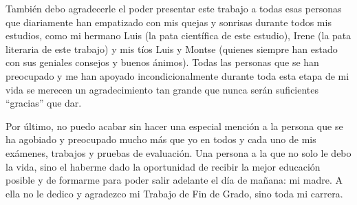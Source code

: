 También debo agradecerle el poder presentar este trabajo a todas esas personas que diariamente han empatizado con mis quejas y sonrisas durante todos mis estudios, como mi hermano Luis (la pata científica de este estudio), Irene (la pata literaria de este trabajo) y mis tíos Luis y Montse (quienes siempre han estado con sus geniales consejos y buenos ánimos). Todas las personas que se han preocupado y me han apoyado incondicionalmente durante toda esta etapa de mi vida se merecen un agradecimiento tan grande que nunca serán suficientes ``gracias'' que dar.

Por último, no puedo acabar sin hacer una especial mención a la persona que se ha agobiado y preocupado mucho más que yo en todos y cada uno de mis exámenes, trabajos y pruebas de evaluación. Una persona a la que no solo le debo la vida, sino el haberme dado la oportunidad de recibir la mejor educación posible y de formarme para poder salir adelante el día de mañana: mi madre. A ella no le dedico y agradezco mi Trabajo de Fin de Grado, sino toda mi carrera.